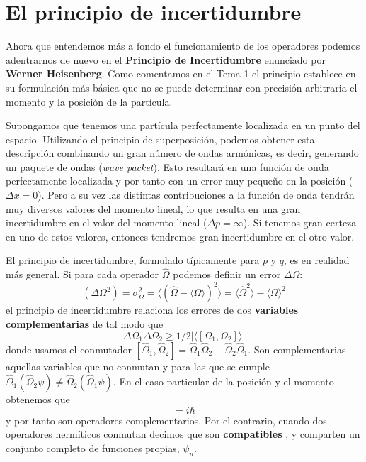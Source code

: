 \section{El principio de incertidumbre}
Ahora que entendemos más a fondo el funcionamiento de los
operadores podemos adentrarnos de nuevo en el
\textbf{Principio de Incertidumbre} enunciado por 
\textbf{Werner Heisenberg}. Como comentamos en el Tema 1
el principio establece en su formulación más básica que 
no se puede determinar con precisión  arbitraria el momento
y la posición de la partícula. 

Supongamos que tenemos una partícula perfectamente 
localizada en un punto del espacio. Utilizando el
principio de superposición, podemos obtener esta 
descripción combinando un gran número de ondas 
armónicas, es decir, generando un paquete de
ondas (\textit{wave packet}). Esto resultará en una
función de onda perfectamente localizada y por tanto
con un error muy pequeño en la posición ($\Delta x=0$).
Pero a su vez las distintas contribuciones a la función 
de onda tendrán muy diversos valores del momento lineal, 
lo que resulta en una gran incertidumbre en el valor 
del momento lineal ($\Delta p=\infty$). Si tenemos gran
certeza en uno de estos valores, entonces
tendremos gran incertidumbre en el otro valor.

El principio de incertidumbre, formulado típicamente para
$p$ y $q$, es en realidad más general. Si para cada 
operador $\hat{\Omega}$ podemos definir un error $\Delta\Omega$:
\begin{equation}
    (\Delta\Omega^2)=\sigma^2_\Omega=\langle (\hat{\Omega} - \langle \Omega\rangle)^2 \rangle=
    \langle\hat{\Omega}^2\rangle - \langle\Omega\rangle^2
\end{equation}
el principio de incertidumbre relaciona los errores de dos
\textbf{variables complementarias} de tal modo que
\begin{equation}
\Delta\Omega_1\Delta\Omega_2\geq
1/2|\langle[\Omega_1,\Omega_2]\rangle|
\end{equation}
donde  usamos el conmutador  $[\hat{\Omega}_1,\hat{\Omega}_2] =
\hat{\Omega}_1\hat{\Omega}_2 -\hat{\Omega}_2\hat{\Omega}_1$.
Son complementarias aquellas variables que no conmutan y para
las que se cumple 
$\hat{\Omega}_1(\hat{\Omega}_2\psi)\neq\hat{\Omega}_2(\hat{\Omega}_1\psi)$.
En el caso particular de la posición y el momento obtenemos que
\begin{equation}
    [\hat{x},\hat{p}_x] = i\hbar
\end{equation}
y por tanto son operadores
complementarios. Por el contrario, cuando
dos operadores hermíticos conmutan decimos 
que son \textbf{compatibles }, y comparten un conjunto
completo de funciones propias, $\psi_n$.

